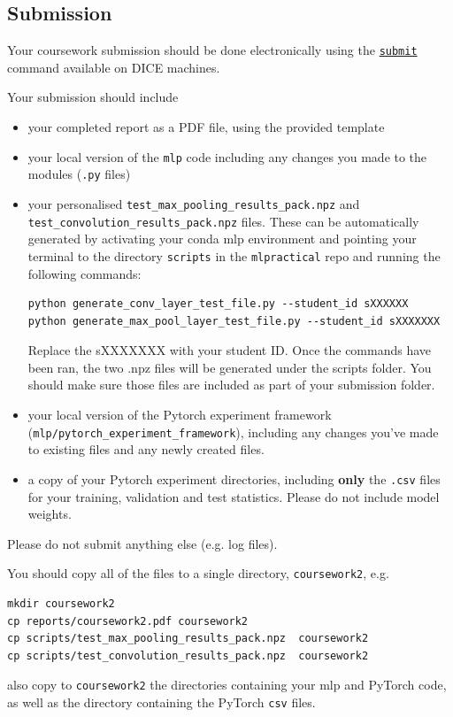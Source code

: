 \documentclass[11pt,]{article}
\begin{document}
\subsection{Submission}
\label{sec:submission}

Your coursework submission should be done electronically using the
\href{http://computing.help.inf.ed.ac.uk/submit}{\texttt{submit}}
command available on DICE machines.

Your submission should include

\begin{itemize}

\item
  your completed report as a PDF file, using the provided template
\item
  your local version of the \texttt{mlp} code including any changes
  you made to the modules (\texttt{.py} files)
 \item your personalised \texttt{test\_max\_pooling\_results\_pack.npz} and \texttt{test\_convolution\_results\_pack.npz} files. These can be automatically generated by activating your conda mlp environment and pointing your terminal to the directory \texttt{scripts} in the \texttt{mlpractical} repo and running the following commands: 
 \begin{verbatim}
python generate_conv_layer_test_file.py --student_id sXXXXXX
python generate_max_pool_layer_test_file.py --student_id sXXXXXXX
\end{verbatim}
Replace the sXXXXXXX with your student ID. Once the commands have been ran, the two .npz files will be generated under the scripts folder. You should make sure those files are included as part of your submission folder.

 \item your local version of the Pytorch experiment framework (\texttt{mlp/pytorch\_experiment\_framework}), including any changes you've made to existing files and any newly created files.
 \item a copy of your Pytorch experiment directories, including \textbf{only} the \texttt{.csv} files for your training, validation and test statistics. Please do not include model weights.

\end{itemize}
Please do not submit anything else (e.g. log files).

You should copy all of the files to a single directory, \verb+coursework2+, e.g.

\begin{verbatim}
mkdir coursework2
cp reports/coursework2.pdf coursework2
cp scripts/test_max_pooling_results_pack.npz  coursework2
cp scripts/test_convolution_results_pack.npz  coursework2
\end{verbatim}
also copy to \texttt{coursework2} the directories containing your mlp and PyTorch code, as well as the directory containing the PyTorch \texttt{csv} files.
\end{document}
